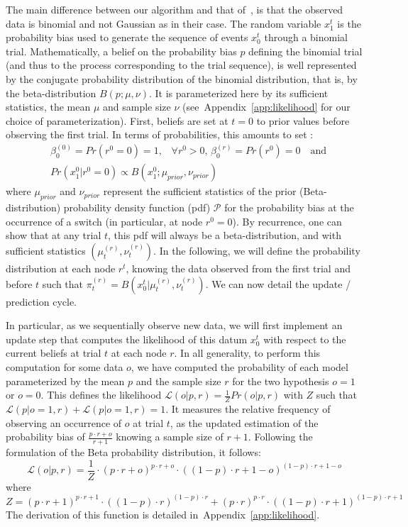 \documentclass[12pt,english]{article}%
\newcommand{\eq}[1]{\begin{equation*}#1\end{equation*}}
\newcommand{\eql}[1]{\begin{equation}#1\end{equation}}
\newcommand{\eqa}[1]{\begin{align}#1\end{align}}
\newcommand{\Ll}{\mathcal{L}}
\newcommand{\Pp}{\mathcal{P}}
\newcommand{\citep}[1]{\parencite{#1}}
\newcommand{\seeApp}[1]{Appendix~\ref{app:#1}}
\begin{document}
The main difference between our algorithm and that of~\citep{AdamsMackay2007},
is that the observed data is binomial and not Gaussian as in their case.
The random variable $x_1^t$ is the probability bias used
to generate the sequence of events $x_0^t$ through a binomial trial.
Mathematically, a belief on the probability bias $p$ defining the binomial trial (and thus to the process corresponding to the trial sequence),
is well represented by the conjugate probability distribution of the binomial distribution,
that is, by the beta-distribution $B(p; \mu, \nu)$.
It is parameterized here by its sufficient statistics,
the mean $\mu$ and sample size $\nu$
(see~\seeApp{likelihood} for our choice of parameterization).
First, beliefs are set at $t=0$ to prior values before observing the first trial.
In terms of probabilities, this amounts to set :
\eqa{
& \beta^{(0)}_0=Pr(r^0=0)=1 \text{,}\quad \forall r^0>0 \text{, } \beta^{(r)}_0=Pr(r^0)=0 \quad \text{and} \\
& Pr(x_1^0 | r^0=0) \propto B(x_1^0; \mu_{prior}, \nu_{prior})
}
where $\mu_{prior}$ and $\nu_{prior}$ represent the sufficient statistics
of the prior (Beta-distribution) probability density function (pdf) $\Pp$
for the probability bias
at the occurrence of a switch (in particular, at node $r^0=0$).
By recurrence, one can show that at any trial $t$,
this pdf will always be a beta-distribution,
and with sufficient statistics $(\mu^{(r)}_{t}, \nu^{(r)}_{t})$.
In the following, we will define the probability distribution at each node $r^t$,
knowing the data observed from the first trial and before $t$ such that
$
\pi^{(r)}_t = B( x_0^t |  \mu^{(r)}_{t}, \nu^{(r)}_{t})
$. %
We can now detail the update / prediction cycle.

In particular, as we sequentially observe new data,
we will first implement an update step that
computes the likelihood of this datum $x_0^t$ with respect to
the current beliefs at trial $t$ at each node $r$.
In all generality, to perform this computation for some data $o$,
we have computed the probability of each model
parameterized by the mean $p$ and the sample size $r$
for the two hypothesis $o=1$ or $o=0$.
This defines the likelihood
$\Ll(o | p, r) = \frac{1}{Z} Pr(o |p, r)$
with $Z$ such that $\Ll(p | o=1, r) + \Ll(p | o=1, r)=1$.
It measures the relative frequency of observing an occurrence of $o$ at trial $t$,
as the updated estimation of the probability bias of $\frac{p\cdot r + o}{r+1}$
knowing a sample size of $r+1$.
Following the formulation of the Beta probability distribution, it follows:
\eql{%
\Ll(o | p, r) = \frac{1}{Z} \cdot {(p\cdot r + o)}^{p\cdot r + o} \cdot {((1- p)\cdot r + 1- o)}^{(1- p)\cdot r + 1- o}
\label{eq:likelihood}
}
where
\eq{
Z = {(p\cdot r + 1)}^{p\cdot r + 1}  \cdot {((1- p)\cdot r )}^{(1- p)\cdot r }  +
    {(p\cdot r )}^{p\cdot r }  \cdot {((1- p)\cdot r + 1)}^{(1- p)\cdot r + 1}
}
The derivation of this function is detailed in~\seeApp{likelihood}.
\end{document}
